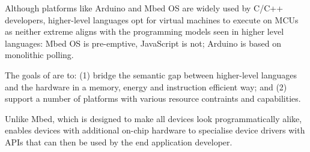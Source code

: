 Although platforms like Arduino and Mbed OS are widely used by C/C++ developers, 
higher-level languages opt for virtual machines to execute on MCUs 
as neither extreme aligns with the programming models seen in higher level languages: 
Mbed OS is pre-emptive, JavaScript is not; Arduino is based on monolithic polling. 

The goals of \CO are to: (1) bridge the semantic gap between 
higher-level languages and the hardware in a memory, energy and instruction 
efficient way; and (2) support a number of platforms with various
resource contraints and capabilities.

Unlike Mbed, which is designed to make all devices look programmatically alike,
\CO enables devices with additional on-chip hardware to specialise device drivers 
with APIs that can then be used by the end application developer.


